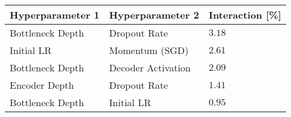 \begin{tabular}{lll}
\toprule
Hyperparameter 1 & Hyperparameter 2 & Interaction [\%] \\
\midrule
Bottleneck Depth & Dropout Rate & $3.18$ \\
Initial LR & Momentum (SGD) & $2.61$ \\
Bottleneck Depth & Decoder Activation & $2.09$ \\
Encoder Depth & Dropout Rate & $1.41$ \\
Bottleneck Depth & Initial LR & $0.95$ \\
\bottomrule
\end{tabular}
